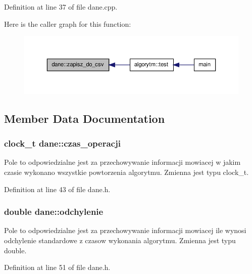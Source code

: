 Definition at line 37 of file dane.\-cpp.



Here is the caller graph for this function\-:\nopagebreak
\begin{figure}[H]
\begin{center}
\leavevmode
\includegraphics[width=350pt]{classdane_a8427efc3e40d63911205b297aecb4ca9_icgraph}
\end{center}
\end{figure}




\subsection{Member Data Documentation}
\hypertarget{classdane_a2301ccecd10f96a73e6816fc415e4edb}{
\subsubsection[{czas\-\_\-operacji}]{\setlength{\rightskip}{0pt plus 5cm}clock\-\_\-t dane\-::czas\-\_\-operacji}}\label{classdane_a2301ccecd10f96a73e6816fc415e4edb}
Pole to odpowiedzialne jest za przechowywanie informacji mowiacej w jakim czasie wykonano wszystkie powtorzenia algorytmu. Zmienna jest typu clock\-\_\-t. 

Definition at line 43 of file dane.\-h.

\hypertarget{classdane_adf1201c327225fc441f65b6d3b0d17e9}{
\subsubsection[{odchylenie}]{\setlength{\rightskip}{0pt plus 5cm}double dane\-::odchylenie}}\label{classdane_adf1201c327225fc441f65b6d3b0d17e9}
Pole to odpowiedzialne jest za przechowywanie informacji mowiacej ile wynosi odchylenie standardowe z czasow wykonania algorytmu. Zmienna jest typu double. 

Definition at line 51 of file dane.\-h.

